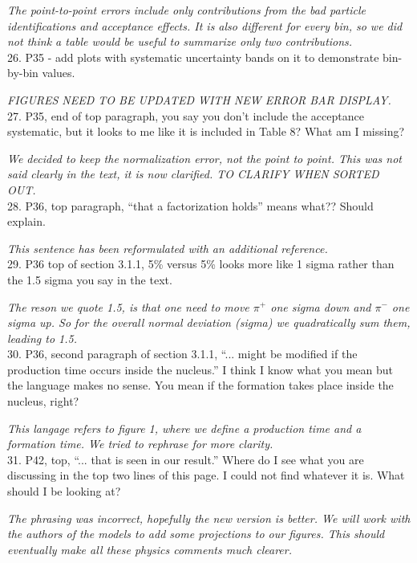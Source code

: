 \documentclass[12pt]{article}
\begin{document}
{\it The point-to-point errors include only contributions from the bad particle 
identifications and acceptance effects. It is also different for every bin, so
we did not think a table would be useful to summarize only two contributions.} \\

26.
P35 -
 add plots with systematic uncertainty bands on it to demonstrate bin-by-bin values.

{\it FIGURES NEED TO BE UPDATED WITH NEW ERROR BAR DISPLAY.} \\


27.
P35, end of top paragraph, you say you don’t include the acceptance systematic, but it looks 
to me like it is included in Table 8?  What am I missing?

{\it We decided to keep the normalization error, not the point to point. This was not
said clearly in the text, it is now clarified. TO CLARIFY WHEN SORTED OUT.} \\


28.
P36, top paragraph, “that a factorization holds” means what??  Should explain.  

{\it This sentence has been reformulated with an additional reference.} \\


29.
P36 top of section 3.1.1, 5\% versus 5\% looks more like 1 sigma rather than the 1.5 sigma 
you say in the text.

{\it The reson we quote 1.5, is that one need to move $\pi^+$ one sigma down and $\pi^-$ one
sigma up. So for the overall normal deviation (sigma) we quadratically sum them,
leading to 1.5.} \\

30.
P36, second paragraph of section 3.1.1, “... might be modified if the production time occurs 
inside the nucleus.”  I think I know what you mean but the language makes no sense.  You 
mean if the formation takes place inside the nucleus, right?

{\it This langage refers to figure 1, where we define a production time and a 
formation time. We tried to rephrase for more clarity.}\\

31.
P42, top, “... that is seen in our result.”  Where do I see what you are discussing in the top 
two lines of this page.  I could not find whatever it is.  What should I be looking at?

{\it The phrasing was incorrect, hopefully the new version is better. We will work with 
the authors of the models to add some projections to our figures. This should eventually
make all these physics comments much clearer.} \\
\end{document}
